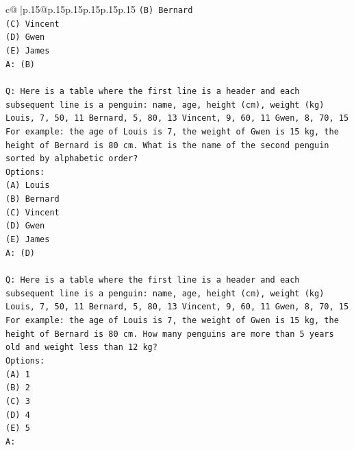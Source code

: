 \documentclass{article}
\begin{document}
{\begin{supertabular}{c@{$\;$}|p{.15\linewidth}@{}p{.15\linewidth}p{.15\linewidth}p{.15\linewidth}p{.15\linewidth}p{.15\linewidth}}
{{{\texttt{(B) Bernard} \\
\texttt{(C) Vincent} \\
\texttt{(D) Gwen} \\
\texttt{(E) James} \\
\texttt{A: (B)} \\
\\ 
\texttt{Q: Here is a table where the first line is a header and each subsequent line is a penguin:  name, age, height (cm), weight (kg) Louis, 7, 50, 11 Bernard, 5, 80, 13 Vincent, 9, 60, 11 Gwen, 8, 70, 15  For example: the age of Louis is 7, the weight of Gwen is 15 kg, the height of Bernard is 80 cm.  What is the name of the second penguin sorted by alphabetic order?} \\
\texttt{Options:} \\
\texttt{(A) Louis} \\
\texttt{(B) Bernard} \\
\texttt{(C) Vincent} \\
\texttt{(D) Gwen} \\
\texttt{(E) James} \\
\texttt{A: (D)} \\
\\ 
\texttt{Q: Here is a table where the first line is a header and each subsequent line is a penguin:  name, age, height (cm), weight (kg) Louis, 7, 50, 11 Bernard, 5, 80, 13 Vincent, 9, 60, 11 Gwen, 8, 70, 15  For example: the age of Louis is 7, the weight of Gwen is 15 kg, the height of Bernard is 80 cm.  How many penguins are more than 5 years old and weight less than 12 kg?} \\
\texttt{Options:} \\
\texttt{(A) 1} \\
\texttt{(B) 2} \\
\texttt{(C) 3} \\
\texttt{(D) 4} \\
\texttt{(E) 5} \\
\texttt{A:} \\
            }
        }
    }
     \\ \\


\end{supertabular}}
\end{document}
